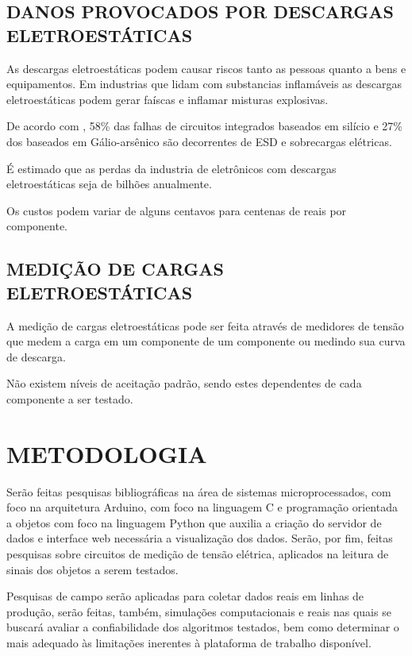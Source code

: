 \documentclass[
	12pt,				%
	openright,			%
	oneside,			%
	a4paper,			%
	chapter=TITLE,		%
	english,			%
	french,				%
	spanish,			%
	brazil,				%
	article,			%
	]{uea-abntex2}
\begin{document}
\subsection{DANOS PROVOCADOS POR DESCARGAS ELETROESTÁTICAS}
As descargas eletroestáticas podem causar riscos tanto as pessoas quanto a bens e equipamentos.
Em industrias que lidam com substancias inflamáveis as descargas eletroestáticas podem gerar faíscas e inflamar misturas explosivas. \cite{kassebaum}

De acordo com \citeauthor{Hwang2005}, 58\% das falhas de circuitos integrados baseados em silício e 27\% dos baseados em Gálio-arsênico são decorrentes de ESD e sobrecargas elétricas.

É estimado que as perdas da industria de eletrônicos com descargas eletroestáticas seja de bilhões anualmente. \cite{Hwang2005}

Os custos podem variar de alguns centavos para centenas de reais por componente.

\subsection{MEDIÇÃO DE CARGAS ELETROESTÁTICAS}
A medição de cargas eletroestáticas pode ser feita através de medidores de tensão que medem a carga em um componente de um componente ou medindo sua curva de descarga.\cite{Berndt2010}

Não existem níveis de aceitação padrão, sendo estes dependentes de cada componente a ser testado.  
\section{METODOLOGIA}

\hspace*{0.8cm}Serão feitas pesquisas bibliográficas na área de sistemas microprocessados, com foco na arquitetura Arduino, com foco na linguagem C e programação orientada a objetos com foco na linguagem Python\cite{python} que auxilia a criação do servidor de dados e interface web necessária a visualização dos dados. Serão, por fim, feitas pesquisas sobre circuitos de medição de tensão elétrica, aplicados na leitura de sinais dos objetos a serem testados.

Pesquisas de campo serão aplicadas para coletar dados reais em linhas de produção, serão feitas, também, simulações computacionais e reais nas quais se buscará avaliar a confiabilidade dos algoritmos testados, bem como determinar o mais adequado às limitações inerentes à plataforma de trabalho disponível.
\end{document}
